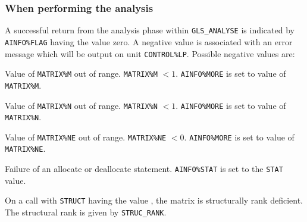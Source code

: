\documentclass{galahad}
\newcommand{\packagename}{GLS}
\begin{document}

\galerrors
\subsubsection{When performing the analysis} \label{errora}

A successful return from the analysis phase within {\tt \packagename\_ANALYSE} 
  is indicated by {\tt AINFO\%FLAG}  having the value zero.  A negative value is
 associated with an error message which will  be output on unit
 {\tt CONTROL\%LP}. Possible negative values are: 

\begin{description}

  Value of {\tt MATRIX\%M} out of range.  {\tt MATRIX\%M} $<1$.
{\tt AINFO\%MORE} is set to value of {\tt MATRIX\%M}.

  Value of {\tt MATRIX\%N} out of range.  {\tt MATRIX\%N} $<1$.
{\tt AINFO\%MORE} is set to value of {\tt MATRIX\%N}.

  Value of {\tt MATRIX\%NE} out of range.  {\tt MATRIX\%NE} $<0$.
{\tt AINFO\%MORE} is set to value of {\tt MATRIX\%NE}.

  Failure of an allocate or deallocate statement. {\tt AINFO\%STAT} 
is set to the {\tt STAT} value.

  On a call with {\tt STRUCT} having the value \true,
        the matrix is structurally rank deficient.
       The structural rank is given by {\tt STRUC\_RANK}.

\end{description}
\end{document}
